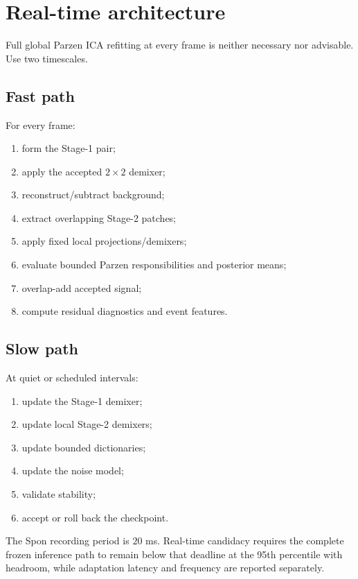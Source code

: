 \documentclass[11pt]{article}
\begin{document}
\section{Real-time architecture}

Full global Parzen ICA refitting at every frame is neither necessary nor
advisable. Use two timescales.

\subsection{Fast path}

For every frame:
\begin{enumerate}[leftmargin=*]
\item form the Stage-1 pair;
\item apply the accepted $2\times2$ demixer;
\item reconstruct/subtract background;
\item extract overlapping Stage-2 patches;
\item apply fixed local projections/demixers;
\item evaluate bounded Parzen responsibilities and posterior means;
\item overlap-add accepted signal;
\item compute residual diagnostics and event features.
\end{enumerate}

\subsection{Slow path}

At quiet or scheduled intervals:
\begin{enumerate}[leftmargin=*]
\item update the Stage-1 demixer;
\item update local Stage-2 demixers;
\item update bounded dictionaries;
\item update the noise model;
\item validate stability;
\item accept or roll back the checkpoint.
\end{enumerate}

The Spon recording period is $20$ ms. Real-time candidacy requires the complete
frozen inference path to remain below that deadline at the 95th percentile with
headroom, while adaptation latency and frequency are reported separately.
\end{document}
